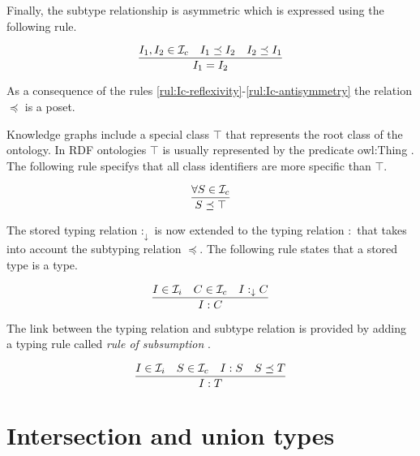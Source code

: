 \documentclass[runningheads]{llncs}
\newcommand{\darr}{\downarrow}
\newcommand{\I}{{\cal I}}
\newcommand{\memo}[1]{}
\begin{document}
Finally, the subtype relationship is asymmetric which is expressed
using the following rule. 

\begin{equation}
\label{rul:Ic-antisymmetry}
\dfrac{I_1,I_2\in\I_c \quad I_1\preceq\/I_2 \quad I_2\preceq\/I_1}
      {I_1=I_2}   
\end{equation}

As a consequence of the rules
\ref{rul:Ic-reflexivity}-\ref{rul:Ic-antisymmetry} the relation
$\preceq$ is a poset.

Knowledge graphs include a special class $\top$ that represents the
root class of the ontology. In RDF ontologies $\top$ is usually
represented by the predicate owl:Thing \cite{Hoffart2013}. The
following rule specifys that all class identifiers are more specific
than $\top$.

\begin{equation}
\dfrac{\forall\/S\in\I_c}
      {S\preceq\top}
\end{equation}

The stored typing relation $:_\darr$ is now extended to the typing
relation $:$ that takes into account the subtyping relation $\preceq$.
The following rule states that a stored type is a type.

\begin{equation}
\dfrac{I\in\I_i \quad C\in\I_c \quad I:_\darr\/C}
      {I:C}
\end{equation}

The link between the typing relation and subtype relation is provided
by adding a typing rule called \emph{rule of subsumption}
\cite{Pierce2002}.

\begin{equation}
\label{rul:typing-subsumption}
\dfrac{I\in\I_i\quad S\in\I_c\quad I:S \quad S\preceq\/T}
      {I:T}    
\end{equation}


\memo{Properties have dual role: they are instances and types at the same time.}
\memo{Present the features of properties from this point of view.}






\section{Intersection and union types\label{sec:intsc-union}}
\end{document}
